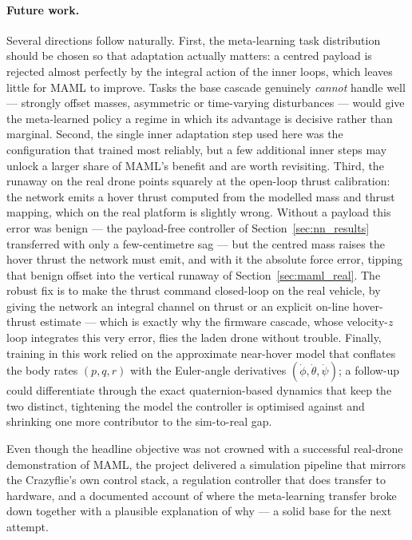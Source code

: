 \documentclass[11pt,a4paper]{article}
\theoremstyle{remark}
\numberwithin{equation}{section}
\begin{document}
\paragraph{Future work.}
Several directions follow naturally. First, the meta-learning task distribution
should be chosen so that adaptation actually matters: a centred payload is rejected
almost perfectly by the integral action of the inner loops, which leaves little for
MAML to improve. Tasks the base cascade genuinely \emph{cannot} handle well ---
strongly offset masses, asymmetric or time-varying disturbances --- would give the
meta-learned policy a regime in which its advantage is decisive rather than
marginal. Second, the single inner adaptation step used here was the configuration
that trained most reliably, but a few additional inner steps may unlock a larger
share of MAML's benefit and are worth revisiting. Third, the runaway on the real
drone points squarely at the open-loop thrust calibration: the network emits a
hover thrust computed from the modelled mass and thrust mapping, which on the real
platform is slightly wrong. Without a payload this error was benign --- the
payload-free controller of Section~\ref{sec:nn_results} transferred with only a
few-centimetre sag --- but the centred mass raises the hover thrust the network
must emit, and with it the absolute force error, tipping that benign offset into
the vertical runaway of Section~\ref{sec:maml_real}. The robust fix is to make the
thrust command closed-loop on the real vehicle, by giving the network an integral
channel on thrust or an explicit on-line hover-thrust estimate --- which is exactly
why the firmware cascade, whose velocity-$z$ loop integrates this very error, flies
the laden drone without trouble. Finally, training in this
work relied on the approximate near-hover model that conflates the body rates
$(p,q,r)$ with the Euler-angle derivatives $(\dot\phi,\dot\theta,\dot\psi)$; a
follow-up could differentiate through the exact quaternion-based dynamics that keep
the two distinct, tightening the model the controller is optimised against and
shrinking one more contributor to the sim-to-real gap.

Even though the headline objective was not crowned with a successful real-drone
demonstration of MAML, the project delivered a simulation pipeline that mirrors the
Crazyflie's own control stack, a regulation controller that does transfer to
hardware, and a documented account of where the meta-learning transfer broke down
together with a plausible explanation of why --- a solid base for the next attempt.

\newpage


\end{document}

